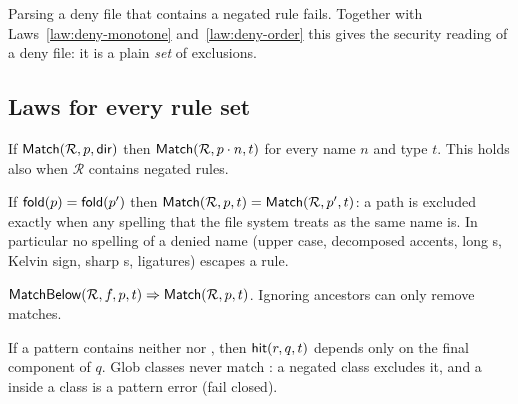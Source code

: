 \begin{law}
\label{law:no-negation}
Parsing a deny file that contains a negated rule fails.  Together with
Laws~\ref{law:deny-monotone} and~\ref{law:deny-order} this gives the security
reading of a deny file: it is a plain \emph{set} of exclusions.
\end{law}

\subsection{Laws for every rule set}

\begin{law}
\label{law:ancestor}
If $\mathsf{Match}(\mathcal R,p,\mathsf{dir})$ then $\mathsf{Match}(\mathcal R,p\cdot n,t)$ for every
name $n$ and type $t$.  This holds also when $\mathcal R$ contains negated
rules.
\end{law}

\begin{law}
\label{law:fold-invariance}
If $\mathsf{fold}(p)=\mathsf{fold}(p')$ then $\mathsf{Match}(\mathcal R,p,t)=\mathsf{Match}(\mathcal R,p',t)$:
a path is excluded exactly when any spelling that the file system treats as the
same name is.  In particular no spelling of a denied name (upper case, decomposed
accents, long s, Kelvin sign, sharp s, ligatures) escapes a rule.
\end{law}

\begin{law}[Narrowing]
\label{law:narrowing}
$\mathsf{MatchBelow}(\mathcal R,f,p,t)\Rightarrow\mathsf{Match}(\mathcal R,p,t)$.  Ignoring
ancestors can only remove matches.
\end{law}

\begin{law}
\label{law:component}
If a pattern contains neither \code{/} nor \code{**}, then $\mathsf{hit}(r,q,t)$ depends
only on the final component of $q$.  Glob classes never match \code{/}: a
negated class excludes it, and a \code{/} inside a class is a pattern error
(fail closed).
\end{law}

